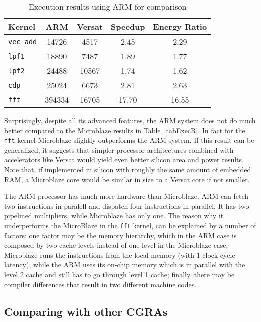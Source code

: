 \begin{table}[!htb]
  \renewcommand{\arraystretch}{1.2} %
  \caption{Execution results using ARM for comparison}
  \label{tabExecR2}
  \centering
  \begin{tabular}{lcccc}
    \toprule
    Kernel & ARM & Versat & Speedup & Energy Ratio\\
    \midrule
    {\tt vec\_add} &  14726 &  4517 &  2.45 &  2.29\\
    {\tt lpf1}     &  18890 &  7487 &  1.89 &  1.77\\
    {\tt lpf2}     &  24488 & 10567 &  1.74 &  1.62\\
    {\tt cdp}      &  25024 &  6673 &  2.81 &  2.63\\
    {\tt fft}      & 394334 & 16705 & 17.70 & 16.55\\
    \bottomrule
  \end{tabular}
\end{table}

Surprisingly, despite all its advanced features, the ARM system does
not do much better compared to the Microblaze results in
Table~\ref{tabExecR}. In fact for the {\tt fft} kernel Microblaze
slightly outperforms the ARM system. If this result can be
generalized, it suggests that simpler processor architectures combined
with accelerators like Versat would yield even better silicon area and
power results. Note that, if implemented in silicon with roughly the
same amount of embedded RAM, a Microblaze core would be similar in
size to a Versat core if not smaller.

The ARM processor has much more hardware than Microblaze. ARM can
fetch two instructions in paralell and dispatch four instructions in
parallel. It has two pipelined multipliers, while Microblaze has only
one. The reason why it underperforms the MicroBlaze in the {\tt fft}
kernel, can be explained by a number of factors: one factor may be the
memory hierarchy, which in the ARM case is composed by two cache
levels instead of one level in the Microblaze case; Microblaze runs
the instructions from the local memory (with 1 clock cycle latency),
while the ARM uses its on-chip memory which is in parallel with the
level 2 cache and still has to go through level 1 cache; finally,
there may be compiler differences that result in two different machine
codes.


\subsection{Comparing with other CGRAs}


